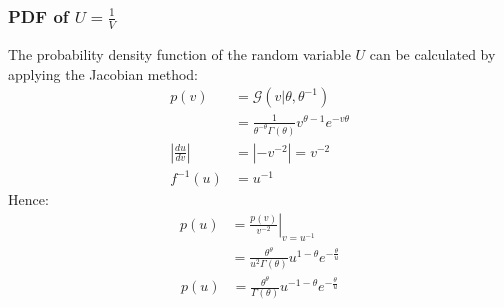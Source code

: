 \documentclass[a4paper]{article}
\begin{document}
\subsubsection{PDF of $U=\frac{1}{V}$}
The probability density function of the random variable $U$ can be calculated by applying the Jacobian method:
\begin{align*}
     p(v) &= \mathcal{G}(v | \theta, \theta^{-1}) \\
    &= \frac{1}{\theta^{-\theta} \Gamma (\theta)} v^{\theta - 1} e^{-v \theta} \\
    \left| \frac{du}{dv} \right| &= \left| -v^{-2} \right| = v^{-2} \\
    f^{-1} (u) &= u^{-1}
\end{align*}
Hence:
\begin{align*}
    p(u) &= \left. \frac{p(v)}{v^{-2}} \right|_{v=u^{-1}} \\
    &= \frac{\theta^{\theta}}{u^2 \Gamma(\theta)} u^{1-\theta} e^{-\frac{\theta}{u}}
\end{align*}
\begin{align}\label{eq:pdf_of_u}
    p(u) &= \frac{\theta^{\theta}}{\Gamma(\theta)} u^{-1-\theta} e^{-\frac{\theta}{u}}
\end{align}
\end{document}
